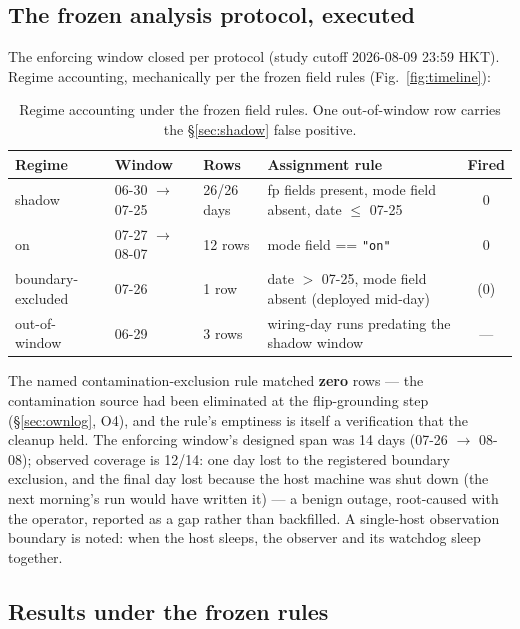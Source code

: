 \documentclass[11pt]{article}
\begin{document}
\subsection{The frozen analysis protocol, executed}
\label{sec:regimes}

The enforcing window closed per protocol (study cutoff 2026-08-09
23:59 HKT). Regime accounting, mechanically per the frozen field rules
(Fig.~\ref{fig:timeline}):

\begin{table}[h]
\centering\small
\begin{tabular}{@{}lllp{5.4cm}c@{}}
\toprule
\textbf{Regime} & \textbf{Window} & \textbf{Rows} &
\textbf{Assignment rule} & \textbf{Fired} \\
\midrule
shadow & 06-30 $\rightarrow$ 07-25 & 26/26 days & fp fields present,
mode field absent, date $\leq$ 07-25 & 0 \\
on & 07-27 $\rightarrow$ 08-07 & 12 rows & mode field ==
\texttt{"on"} & 0 \\
boundary-excluded & 07-26 & 1 row & date $>$ 07-25, mode field absent
(deployed mid-day) & (0) \\
out-of-window & 06-29 & 3 rows & wiring-day runs predating the shadow
window & --- \\
\bottomrule
\end{tabular}
\caption{Regime accounting under the frozen field rules. One
out-of-window row carries the \S\ref{sec:shadow} false positive.}
\label{tab:regimes}
\end{table}

The named contamination-exclusion rule matched \textbf{zero} rows ---
the contamination source had been eliminated at the flip-grounding step
(\S\ref{sec:ownlog}, O4), and the rule's emptiness is itself a
verification that the cleanup held. The enforcing window's designed
span was 14 days (07-26 $\rightarrow$ 08-08); observed coverage is
12/14: one day lost to the registered boundary exclusion, and the final
day lost because the host machine was shut down (the next morning's run
would have written it) --- a benign outage, root-caused with the
operator, reported as a gap rather than backfilled. A single-host
observation boundary is noted: when the host sleeps, the observer and
its watchdog sleep together.

\subsection{Results under the frozen rules}
\label{sec:results}
\end{document}
